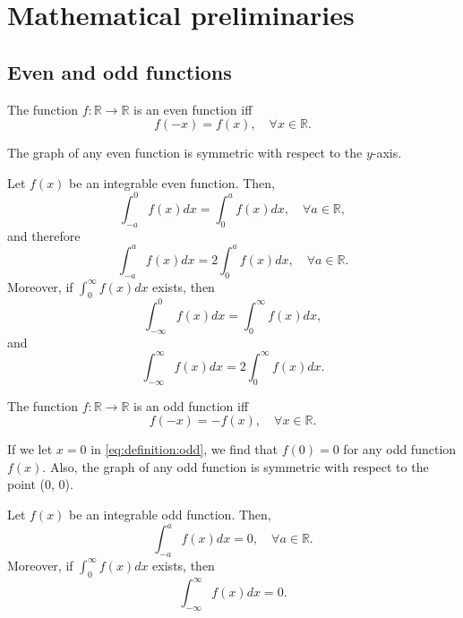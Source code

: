 \chapter{Mathematical preliminaries}

\section{Even and odd functions}

\begin{definition}
    The function \(f : \mathbb{R} \rightarrow \mathbb{R}\) is an even function
    iff
    \begin{equation}
        f(-x) = f(x), \quad \forall x \in \mathbb{R}.
    \end{equation}
\end{definition}
The graph of any even function is symmetric with respect to the \(y\)-axis.

\begin{lemma}
    Let \(f(x)\) be an integrable even function. Then,
    \begin{equation}
        \int_{-a}^{0} f(x) dx = \int_{0}^{a} f(x) dx, \quad \forall a \in \mathbb{R},
    \end{equation}
    and therefore
    \begin{equation}
        \int_{-a}^{a} f(x) dx = 2 \int_{0}^{a} f(x) dx, \quad \forall a \in \mathbb{R}.
    \end{equation}
    Moreover, if \(\int_{0}^{\infty} f(x) dx\) exists, then
    \begin{equation}
        \int_{-\infty}^{0} f(x) dx = \int_{0}^{\infty} f(x) dx,
    \end{equation}
    and
    \begin{equation}
        \int_{-\infty}^{\infty} f(x) dx = 2 \int_{0}^{\infty} f(x) dx.
    \end{equation}
\end{lemma}

\begin{definition}
    The function \(f : \mathbb{R} \rightarrow \mathbb{R}\) is an odd function
    iff
    \begin{equation}
        f(-x) = -f(x), \quad \forall x \in \mathbb{R}.
        \label{eq:definition:odd}
    \end{equation}
\end{definition}
If we let \(x = 0\) in \eqref{eq:definition:odd}, we find that \(f(0) = 0\) for
any odd function \(f(x)\). Also, the graph of any odd function is symmetric with
respect to the point (0, 0).

\begin{lemma}
    Let \(f(x)\) be an integrable odd function. Then,
    \begin{equation}
        \int_{-a}^{a} f(x) dx = 0, \quad \forall a \in \mathbb{R}.
    \end{equation}
    Moreover, if \(\int_{0}^{\infty} f(x) dx\) exists, then
    \begin{equation}
        \int_{-\infty}^{\infty} f(x) dx = 0.
    \end{equation}
\end{lemma}
